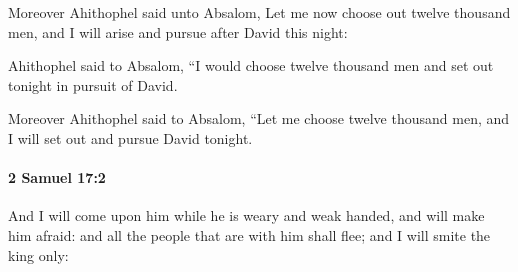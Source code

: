 			\begin{versebox}
					\item[BHS] 
					\item[ASV] Moreover Ahithophel said unto Absalom, Let me now choose out twelve thousand men, and I will arise and pursue after David this night:
					\item[NIV] Ahithophel said to Absalom, “I would choose twelve thousand men and set out tonight in pursuit of David.
					\item[NRSV] Moreover Ahithophel said to Absalom, “Let me choose twelve thousand men, and I will set out and pursue David tonight.
			\end{versebox}

		\paragraph{2 Samuel 17:2} %
			\label{2SAMUEL-17-2}

			And I will come upon him while he is weary and weak handed, and will make him afraid: and all the people that are with him shall flee; and I will smite the king only:

